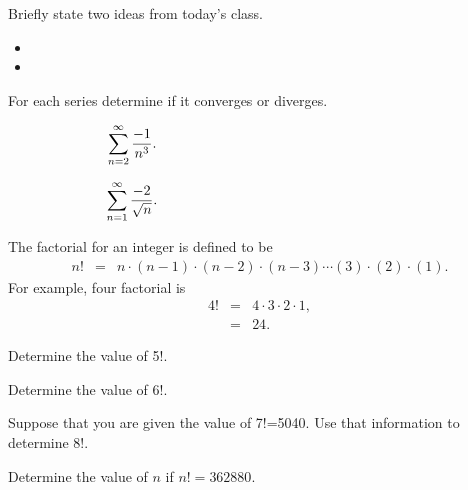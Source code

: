 \postClass

\begin{problem}
\item Briefly state two ideas from today's class.
  \begin{itemize}
  \item
  \item
  \end{itemize}
\item
  \begin{subproblem}
    \item
  \end{subproblem}
\end{problem}


\begin{problem}
\item For each series determine if it converges or diverges.
  \begin{subproblem}
  \item
    \begin{eqnarray*}
      \sum^\infty_{n=2} \frac{-1}{n^3}. & & \hspace{0.5\textwidth}
    \end{eqnarray*}
    \vfill
  \item
    \begin{eqnarray*}
      \sum^\infty_{n=1} \frac{-2}{\sqrt{n}}. & & \hspace{0.5\textwidth}
    \end{eqnarray*}
    \vfill
  \end{subproblem}

  \clearpage

  \item The factorial for an integer is defined to be
  \begin{eqnarray*}
    n! & = & n \cdot (n-1) \cdot (n-2) \cdot (n-3) \cdots (3) \cdot (2) \cdot (1).
  \end{eqnarray*}
  For example, four factorial is
  \begin{eqnarray*}
    4! & = & 4 \cdot 3 \cdot 2 \cdot 1, \\
       & = & 24.
  \end{eqnarray*}

  \begin{subproblem}
  \item Determine the value of 5!.
    \vfill
  \item Determine the value of 6!.
    \vfill
  \item Suppose that you are given the value of 7!=5040. Use that
    information to determine 8!.
    \vfill
  \item Determine the value of $n$ if $n!=362880$.
    \vfill
  \end{subproblem}


\end{problem}


